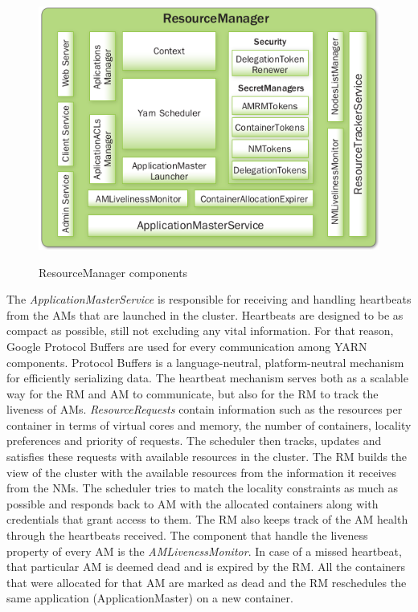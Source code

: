 \begin{figure}
\centering
\includegraphics[scale=0.5]{resources/images/Background/RM_components.png}
\label{fig:yarn_RM_components}
\caption{ResourceManager components \cite{Murthy:2014:AHY:2636998}}
\end{figure}

The \emph{ApplicationMasterService} is responsible for receiving and
handling heartbeats from the AMs that are launched in the
cluster. Heartbeats are designed to be as compact as possible, still
not excluding any vital information. For that reason, Google Protocol
Buffers \cite{proto_buf} are used for every communication among YARN
components. Protocol Buffers is a language-neutral, platform-neutral
mechanism for efficiently serializing data. The heartbeat mechanism
serves both as a scalable way for the RM and AM to communicate, but
also for the RM to track the liveness of AMs. \emph{ResourceRequests}
contain information such as the resources per container in terms of
virtual cores and memory, the number of containers, locality
preferences and priority of requests. The scheduler then tracks,
updates and satisfies these requests with available resources in the
cluster. The RM builds the view of the cluster with the available
resources from the information it receives from the NMs. The scheduler
tries to match the locality constraints as much as possible and
responds back to AM with the allocated containers along with
credentials that grant access to them. The RM also keeps track of the
AM health through the heartbeats received. The component that handle
the liveness property of every AM is the \emph{AMLivenessMonitor}. In
case of a missed heartbeat, that particular AM is deemed dead and
is expired by the RM. All the containers that were allocated for
that AM are marked as dead and the RM reschedules the same application
(ApplicationMaster) on a new container.

